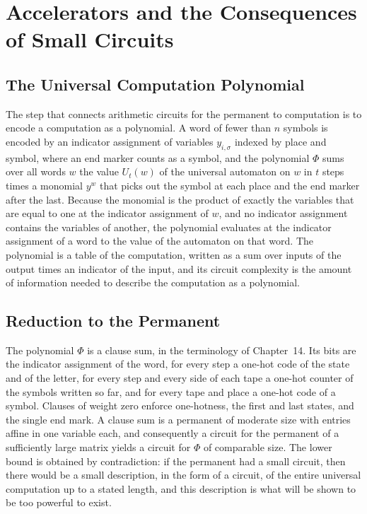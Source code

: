\documentclass[11pt,letterpaper]{report}
\theoremstyle{plain}
\theoremstyle{definition}
\theoremstyle{remark}
\begin{document}
\chapter{Accelerators and the Consequences of Small Circuits}

\section{The Universal Computation Polynomial}

The step that connects arithmetic circuits for the permanent to computation is to encode a computation as a polynomial. A word of fewer than $n$ symbols is encoded by an indicator assignment of variables $y_{i,\sigma}$ indexed by place and symbol, where an end marker counts as a symbol, and the polynomial $\Phi$ sums over all words $w$ the value $U_t(w)$ of the universal automaton on $w$ in $t$ steps times a monomial $y^w$ that picks out the symbol at each place and the end marker after the last. Because the monomial is the product of exactly the variables that are equal to one at the indicator assignment of $w$, and no indicator assignment contains the variables of another, the polynomial evaluates at the indicator assignment of a word to the value of the automaton on that word. The polynomial is a table of the computation, written as a sum over inputs of the output times an indicator of the input, and its circuit complexity is the amount of information needed to describe the computation as a polynomial.

\section{Reduction to the Permanent}

The polynomial $\Phi$ is a clause sum, in the terminology of Chapter~14. Its bits are the indicator assignment of the word, for every step a one-hot code of the state and of the letter, for every step and every side of each tape a one-hot counter of the symbols written so far, and for every tape and place a one-hot code of a symbol. Clauses of weight zero enforce one-hotness, the first and last states, and the single end mark. A clause sum is a permanent of moderate size with entries affine in one variable each, and consequently a circuit for the permanent of a sufficiently large matrix yields a circuit for $\Phi$ of comparable size. The lower bound is obtained by contradiction: if the permanent had a small circuit, then there would be a small description, in the form of a circuit, of the entire universal computation up to a stated length, and this description is what will be shown to be too powerful to exist.
\end{document}
